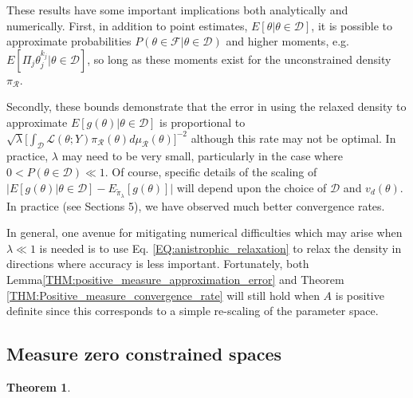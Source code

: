 \documentclass[10pt,fleqn]{article}
\newcommand{\alex}[1]{{\color{red}{Alex: #1}}}
\newtheorem{theorem}{Theorem}
\DeclareMathOperator{\1}{\mathbbm{1}}
\begin{document}
{These results have some important implications both analytically and numerically.  First, in addition to point estimates, $E[\theta|\theta\in\mathcal{D}]$, it is possible to approximate probabilities $P(\theta \in \mathcal{F}|\theta \in \mathcal{D})$ and higher moments, e.g. $E[\Pi_j \theta_j^{k_j} |\theta\in\mathcal{D}]$, so long as these moments exist for the unconstrained density $\pi_\mathcal{R}.$ 

Secondly, these bounds demonstrate that the error in using the relaxed density to approximate $E[g(\theta)|\theta\in\mathcal{D}]$ is proportional to $\sqrt{\lambda} [\int_\mathcal{D}\mathcal{L}(\theta; Y)  \pi_\mathcal{R}(\theta)d\mu_\mathcal{R}(\theta)\big]^{-2}$ although this rate may not be optimal.  In practice, $\lambda$ may need to be very small, particularly in the case where $0<P(\theta\in\mathcal{D})\ll 1.$ Of course, specific details of the scaling of $\bigg|E[g(\theta) |\theta\in\mathcal{D}] - E_{\tilde{\pi}_\lambda}[g(\theta)]   \bigg|$ will depend upon the choice of $\mathcal{D}$ and $v_d(\theta)$. In practice (see Sections 5), we have observed much better convergence rates.

In general, one avenue for mitigating numerical difficulties which may arise when $\lambda \ll 1$ is needed is to use Eq. \ref{EQ:anistrophic_relaxation} to relax the density in directions where accuracy is less important.  Fortunately, both Lemma\ref{THM:positive_measure_approximation_error} and Theorem \ref{THM:Positive_measure_convergence_rate} will still hold when $A$ is positive definite since this corresponds to a simple re-scaling of the parameter space.






\subsection{Measure zero constrained spaces}
\label{SEC:Zero_measure_theory}

\begin{theorem}
\label{THM:RCP_construction}
\alex{We'll need to decide on a choice of notation for this definition: 

}
\end{theorem}}
\end{document}
